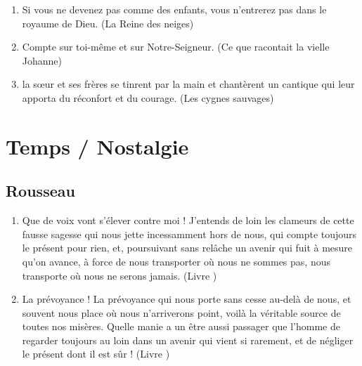 \documentclass[a4paper, 11pt, hidelinks]{article}
\newcommand{\rb}[1]{\Romanbar{#1}}
\begin{document}
\begin{enumerate}
    \item Si vous ne devenez pas comme des enfants, vous n'entrerez pas dans le royaume de Dieu. (La Reine des neiges)
    \item Compte sur toi-même et sur Notre-Seigneur. (Ce que racontait la vielle Johanne)
    \item la s\oe ur et ses frères se tinrent par la main et chantèrent un cantique qui leur apporta du réconfort et du courage. (Les cygnes sauvages)
\end{enumerate}




























\section{Temps / Nostalgie}



\subsection{Rousseau}


\begin{enumerate}
    \item Que de voix vont s'élever contre moi ! J'entends de loin les clameurs de cette fausse sagesse qui nous jette incessamment hors de nous, qui compte toujours le présent pour rien, et, poursuivant sans relâche un avenir qui fuit à mesure qu'on avance, à force de nous transporter où nous ne sommes pas, nous transporte où nous ne serons jamais. (Livre \rb{2})
    \item La prévoyance ! La prévoyance qui nous porte sans cesse au-delà de nous, et souvent nous place où nous n'arriverons point, voilà la véritable source de toutes nos misères. Quelle manie a un être aussi passager que l'homme de regarder toujours au loin dans un avenir qui vient si rarement, et de négliger le présent dont il est sûr ! (Livre \rb{2})
\end{enumerate}
\end{document}
